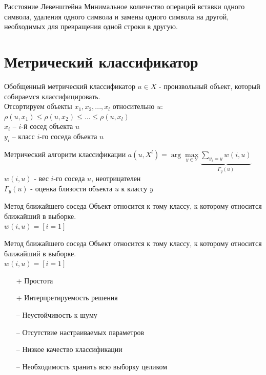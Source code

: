 \documentclass[10pt]{beamer}
\begin{document}
{
\begin{frame}{Расстояние Левенштейна}
	Минимальное количество операций вставки одного символа, удаления одного символа и замены одного символа на другой, необходимых для превращения одной строки в другую.
\end{frame}
}

\section{Метрический классификатор}

\begin{frame}{Обобщенный метрический классификатор}
	$u \in X$ - произвольный объект, который собираемся классифицировать.\\
	\bigbreak
	Отсортируем объекты $x_1, x_2, ..., x_l$ относительно $u$:
	${\rho(u, x_1) \leq \rho(u, x_2) \leq \dots \leq \rho(u, x_l)}$\\
	\bigbreak
	${x_i}$ -- $i$-й сосед объекта $u$\\
	${y_i}$ -- класс $i$-го соседа объекта $u$
\end{frame}

\begin{frame}{Метрический алгоритм классификации}
	${a(u, X^l) = \arg\max\limits_{y \in Y} \underbrace{\sum\limits_{y_i = y} w(i, u)}_{\Gamma_y(u)} }$\\
	\vspace{5mm}
	$w(i, u)$ - вес $i$-го соседа $u$, неотрицателен\\
	$\Gamma_y(u)$ - оценка близости объекта $u$ к классу ${y}$
\end{frame}

\begin{frame}{Метод ближайшего соседа}
	Объект относится к тому классу, к которому относится ближайший в выборке.\\
	${w(i, u) = [i=1]}$\\
\end{frame}

\begin{frame}{Метод ближайшего соседа}
	Объект относится к тому классу, к которому относится ближайший в выборке.\\
	${w(i, u) = [i=1]}$\\
	\bigbreak
	\begin{itemize} [<+- | alert@+>]
		\item[+] Простота
		\item[+] Интерпретируемость решения
	  \bigbreak
		\item[--	] Неустойчивость к шуму
		\item[--	] Отсутствие настраиваемых параметров
		\item[--	] Низкое качество классификации
		\item[--	] Необходимость хранить всю выборку целиком		
	\end{itemize}
\end{frame}
\end{document}
